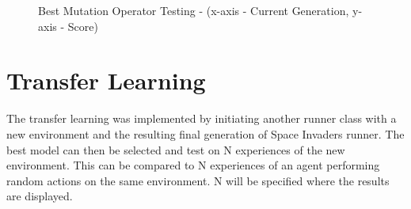 \begin{figure}[ht]
{\begin{minipage}[c]{0.3\textwidth}
    \end{minipage}}
  \hfill
  \hfill
  \caption{Best Mutation Operator Testing - (x-axis - Current Generation, y-axis - Score)}
  \label{fig:mot}
\end{figure}


\section{Transfer Learning}

The transfer learning was implemented by initiating another runner class with a new environment and the resulting final generation of Space Invaders runner. The best model can then be selected and test on N experiences of the new environment. This can be compared to N experiences of an agent performing random actions on the same environment. N will be specified where the results are displayed. 
